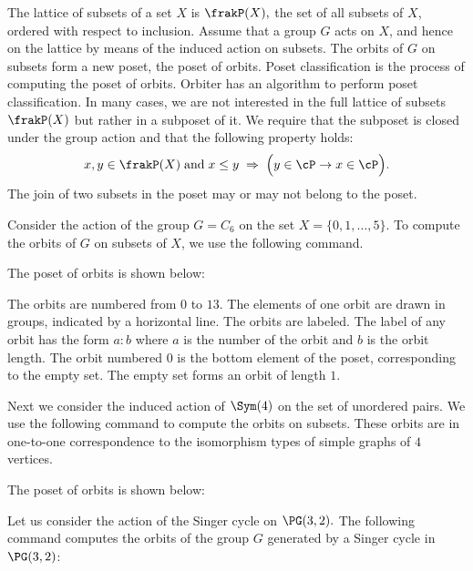 The lattice of subsets of a set $X$ is $\frakP(X),$ the set of all subsets of $X$, ordered with respect to inclusion. 
Assume that a group $G$ acts on $X$, and hence on the lattice by means of the induced action on subsets. 
The orbits of $G$ on subsets form a new poset, the poset of orbits. 
Poset classification is the process of computing the poset of orbits. 
Orbiter has an algorithm to perform poset classification. 
In many cases, we are not interested in the full lattice of subsets $\frakP(X)$ 
but rather in a subposet of it.
We require that the subposet is closed under the group action and that the following property holds:
$$
x, y \in \frakP(X) \; \mbox{and} \; x \le y 
\; \Rightarrow \; 
\Big( y \in \cP \rightarrow x \in \cP \Big).
$$
The join of two subsets in the poset may or may not belong to the poset.



Consider the action of the group $G=C_6$ on the set 
$X=\{0,1,\ldots,5\}.$ 
To compute the orbits of $G$ on subsets of $X$, 
we use the following command. 




The poset of orbits is shown below: 


The orbits are numbered from $0$ to $13$. 
The elements of one orbit are drawn in groups, 
indicated by a horizontal line. 
The orbits are labeled. 
The label of any orbit has the form $a:b$ where $a$ is the 
number of the orbit and $b$ is the orbit length. 
The orbit numbered 0 is the bottom element of the poset, 
corresponding to the empty set.
The empty set forms an orbit of length $1$.


\bigskip

Next we consider the induced action of $\Sym(4)$ on the set of unordered pairs. 
We use the following command to compute the orbits on subsets. These orbits are in one-to-one correspondence to the isomorphism types of simple graphs of $4$ vertices.




The poset of orbits is shown below: 



\bigskip



Let us consider the action of the Singer cycle on $\PG(3,2).$
The following command computes the orbits 
of the group $G$ generated by a Singer cycle in $\PG(3,2)$:

